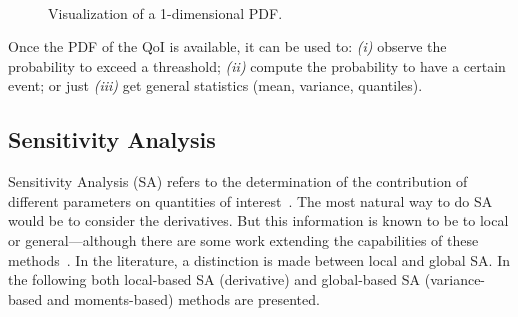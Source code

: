 \begin{figure}[H]               
\centering
{}
 ~       
\caption{Visualization of a 1-dimensional PDF.}
\label{fig:ex_pdf}
\end{figure}

Once the PDF of the QoI is available, it can be used to: \emph{(i)} observe the probability to exceed a threashold; \emph{(ii)} compute the probability to have a certain event; or just \emph{(iii)} get general statistics (mean, variance, quantiles).

\subsection{Sensitivity Analysis}\label{sec:sa}
Sensitivity Analysis (SA) refers to the determination of the contribution of different parameters on quantities of interest~\cite{Saltelli2007,iooss2016}. The most natural way to do SA would be to consider the derivatives. But this information is known to be to local or general---although there are some work extending the capabilities of these methods~\cite{kucherenko2016}. In the literature, a distinction is made between local and global SA. In the following both local-based SA (derivative) and global-based SA (variance-based and moments-based) methods are presented.

